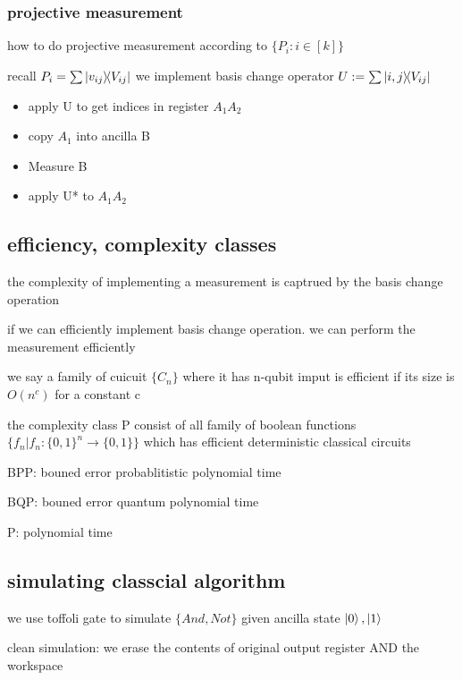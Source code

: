\documentclass[10pt]{article}
\theoremstyle{break}
\begin{document}
        \subsubsection{projective measurement}
        how to do projective measurement according to $\{P_i:i\in[k]\}$

        recall $P_i=\sum\ketbra{v_{ij}}{V_{ij}}$
         we implement basis change operator $U:=\sum\ketbra{i,j}{V_{ij}}$        

         \begin{itemize}
             \item apply U to get indices in register $A_1A_2$
             \item copy $A_1$ into ancilla B 
             \item Measure B 
             \item apply U* to $A_1A_2$
         \end{itemize}



    \subsection{efficiency, complexity classes}
         the complexity of implementing a measurement is captrued by the basis change operation

         if we can efficiently implement basis change operation. we can perform the measurement efficiently

         we say a family of cuicuit $\{C_n\}$ where it has n-qubit imput is 
         efficient if its size is $O(n^c)$ for a constant c


         the complexity class P consist of all family of boolean functions 
         $\{f_n|f_n:\{0,1\}^n\rightarrow\{0,1\}\}$ which has efficient deterministic 
         classical circuits 


         BPP: bouned error probablitistic polynomial time

         BQP: bouned error quantum polynomial time

         P: polynomial time 

    \subsection{simulating classcial algorithm}
        we use toffoli gate to simulate $\{And, Not\}$ given ancilla state $\ket{0},\ket{1}$

        clean simulation: we erase the contents of original output register AND the workspace 
\end{document}
